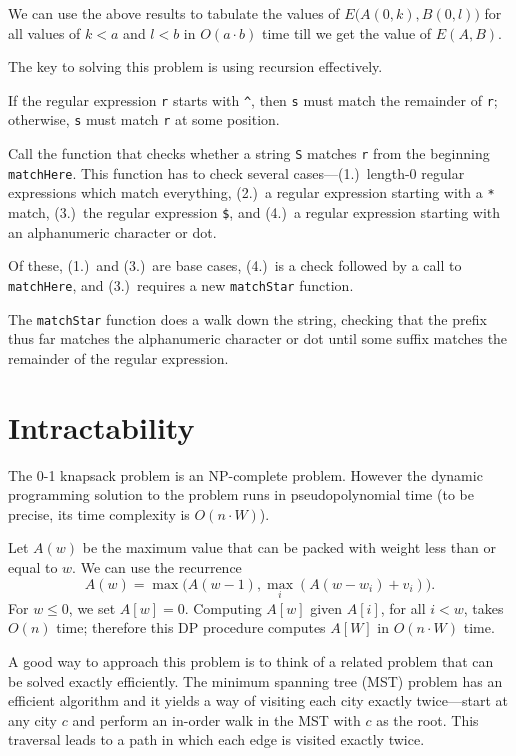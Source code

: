 We can use the above results to tabulate the values of $E\big(A(0,k),
B(0,l)\big)$ for all values of $k < a$ and $l < b$ in $O(a\cdot b)$ time till
we get the value of $E(A,B)$.

The key to solving this problem is using recursion effectively.

If the regular expression \texttt{r} starts with \texttt{\^}, 
then \texttt{s} must  match the remainder of \texttt{r};
otherwise, \texttt{s} must match \texttt{r} at some position.

Call the function that  checks whether a string \texttt{S} matches
\texttt{r} from the beginning \texttt{matchHere}.
This function has to check several cases---(1.)~length-0
regular expressions which match everything, (2.)~a regular
expression starting with a \texttt{*} match, (3.)~the regular expression
\texttt{\$}, and (4.)~a regular
expression starting with an alphanumeric character or dot.

Of these, (1.)~and (3.)~are base cases, (4.)~is a check followed
by a call to \texttt{matchHere}, and (3.)~requires
a new \texttt{matchStar} function.
 
The \texttt{matchStar} function does a walk down the string,
checking that the prefix thus far matches the alphanumeric character or dot until some suffix matches the remainder of the regular expression.








\chapter{ Intractability}

The 0-1 knapsack problem is an NP-complete problem. However
the dynamic programming solution to the problem runs in
pseudopolynomial time (to be precise, its time complexity is $O(n\cdot W)$).

Let $A(w)$ be the maximum value that can be packed with weight less than or equal to $w$.
We can use the recurrence 
\[ A(w) = \max\big(A(w-1), \max_i(A(w-w_i) + v_i)\big) .\]
For $w \leq 0$, we set $A[w] =0$.
Computing $A[w]$ given $A[i]$, for all $i < w$, takes $O(n)$ time; therefore this DP procedure computes $A[W]$ in $O(n\cdot W)$ time.

A good way to approach this problem is to think of a related problem
that can be solved exactly efficiently. The minimum spanning tree (MST) problem
has an efficient algorithm and it yields a way of visiting each city exactly 
twice---start at any city $c$ and perform an in-order walk
in the MST with $c$ as the root.  This traversal leads to a path in 
which each edge is visited exactly twice.

